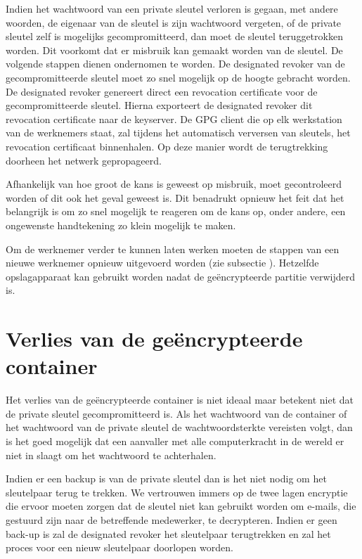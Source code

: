 Indien het wachtwoord van een private sleutel verloren is gegaan, met andere
woorden, de eigenaar van de sleutel is zijn wachtwoord vergeten, of de private
sleutel zelf is mogelijks gecompromitteerd, dan moet de sleutel teruggetrokken
worden. Dit voorkomt dat er misbruik kan gemaakt worden van de sleutel. De
volgende stappen dienen ondernomen te worden. De designated revoker van de
gecompromitteerde sleutel moet zo snel mogelijk op de hoogte gebracht worden. De
designated revoker genereert direct een revocation certificate voor de
gecompromitteerde sleutel. Hierna exporteert de designated revoker dit
revocation certificate naar de keyserver. De \gls{GPG} client die op elk
werkstation
van de werknemers staat, zal tijdens het automatisch verversen van sleutels, het
revocation certificaat binnenhalen. Op deze manier wordt de terugtrekking
doorheen het netwerk gepropageerd.

Afhankelijk van hoe groot de kans is geweest op misbruik, moet gecontroleerd
worden of dit ook het geval geweest is. Dit benadrukt opnieuw het feit dat het
belangrijk is om zo snel mogelijk te reageren om de kans op, onder andere, een
ongewenste handtekening zo klein mogelijk te maken.

Om de werknemer verder te kunnen laten werken moeten de stappen van een nieuwe
werknemer opnieuw uitgevoerd worden (zie subsectie
). Hetzelfde opslagapparaat kan
gebruikt worden nadat de geëncrypteerde partitie verwijderd is.

\section{Verlies van de geëncrypteerde container}
\label{sec:verlies-geencrypteerde-container}

Het verlies van de geëncrypteerde container is niet ideaal maar betekent niet
dat de private sleutel gecompromitteerd is. Als het wachtwoord van de container
of het wachtwoord van de private sleutel de wachtwoordsterkte vereisten volgt,
dan is het goed mogelijk dat een aanvaller met alle computerkracht in de wereld
er niet in slaagt om het wachtwoord te achterhalen.

Indien er een backup is van de private sleutel dan is het niet nodig om het
sleutelpaar terug te trekken. We vertrouwen immers op de twee lagen encryptie
die ervoor moeten zorgen dat de sleutel niet kan gebruikt worden om e-mails, die
gestuurd zijn naar de betreffende medewerker, te decrypteren. Indien er geen
back-up is zal de designated revoker het sleutelpaar terugtrekken en zal het
proces voor een nieuw sleutelpaar doorlopen worden.
